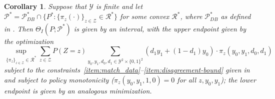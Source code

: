 \documentclass[12pt]{article}%
\newtheorem{corollary}{Corollary}
\theoremstyle{definition}
\newcommand\1{\operatorname{I}\indicatorfence}
\begin{document}
\begin{corollary}\label{cor:optmize_over_pi2}
  Suppose that $\mathcal{Y}$ is finite and let $\mathcal{P}^* = \mathcal{P}_{DB}^* \cap \{P^{*}\colon
  \{\pi_{z}(\cdot)\}_{z \in \mathcal{Z}}\in\mathcal{R}^{*}\}$ for some convex $\mathcal{R}^*$, where $\mathcal{P}_{DB}^*$ as defined in . Then
  ${\Theta}_{I}(P;\mathcal{P}^{*})$ is given by an interval, with the upper
  endpoint given by the optimization
  \begin{equation}\label{eq:theta_value_w_disagreement}
    \sup_{\{\pi_{z} \}_{z \in \mathcal{Z}} \in \mathcal{R}^*} \sum_{z \in \mathcal{Z}} P(Z=z)
    \sum_{y_0,y_{1}, d_0, d_1 \in \mathcal{Y}^2 \times \{0,1\}^2} \left(d_1
      y_1 + (1-d_1)y_0 \right) \cdot \pi_{z}(y_0, y_1, d_0, d_1)
  \end{equation}
  subject to the
  constraints~\ref{item:match_data}--\ref{item:disagreement-bound} given
  in~ and
  subject to policy monotonicity ($\pi_z(y_0, y_1, 1, 0) = 0$ for all
  $z,y_0,y_1$); the lower endpoint is given by an analogous minimization.
\end{corollary}
\end{document}
